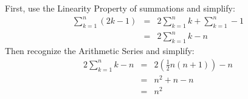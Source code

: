 First, use the Linearity Property of summations and simplify:
\begin{eqnarray*}
	\sum_{k=1}^n \left ( 2k-1 \right ) & = & 2 \sum_{k=1}^n k + \sum_{k=1}^n -1 \\
	& = & 2 \sum_{k=1}^n k - n
\end{eqnarray*}
Then recognize the Arithmetic Series and simplify:
\begin{eqnarray*}
	2 \sum_{k=1}^n k - n & = & 2 \left ( \frac{1}{2} n \left ( n+1 \right ) \right ) - n \\
	& = & n^2 + n - n \\
	& = & n^2
\end{eqnarray*}
